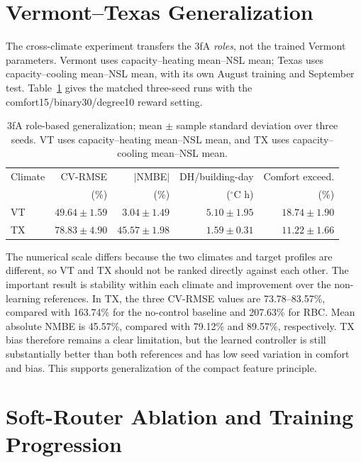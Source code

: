 \section{Vermont--Texas Generalization}

The cross-climate experiment transfers the 3fA \emph{roles}, not the trained
Vermont parameters. Vermont uses capacity--heating mean--NSL mean; Texas uses
capacity--cooling mean--NSL mean, with its own August training and September
test. Table~\ref{tab:climate-generalization} gives the matched three-seed runs
with the comfort15/binary30/degree10 reward setting.

\begin{table}[!htbp]
\small
\begin{center}
\begin{tabular}{|l|r|r|r|r|}
\hline
Climate & CV-RMSE & $|$NMBE$|$ & DH/building-day & Comfort exceed. \\
 & (\%) & (\%) & ($^\circ$C h) & (\%) \\
\hline
VT & $49.64\pm1.59$ & $3.04\pm1.49$ & $5.10\pm1.95$ & $18.74\pm1.90$ \\
TX & $78.83\pm4.90$ & $45.57\pm1.98$ & $1.59\pm0.31$ & $11.22\pm1.66$ \\
\hline
\end{tabular}
\end{center}
\caption{3fA role-based generalization; mean $\pm$ sample standard deviation
over three seeds. VT uses capacity--heating mean--NSL mean, and TX uses
capacity--cooling mean--NSL mean.}
\label{tab:climate-generalization}
\end{table}

The numerical scale differs because the two climates and target profiles are
different, so VT and TX should not be ranked directly against each other. The
important result is stability within each climate and improvement over the
non-learning references. In TX, the three CV-RMSE values are 73.78--83.57\%,
compared with 163.74\% for the no-control baseline and 207.63\% for RBC. Mean
absolute NMBE is 45.57\%, compared with 79.12\% and 89.57\%, respectively. TX
bias therefore remains a clear limitation, but the learned controller is still
substantially better than both references and has low seed variation in comfort
and bias. This supports generalization of the compact feature principle.


\section{Soft-Router Ablation and Training Progression}

